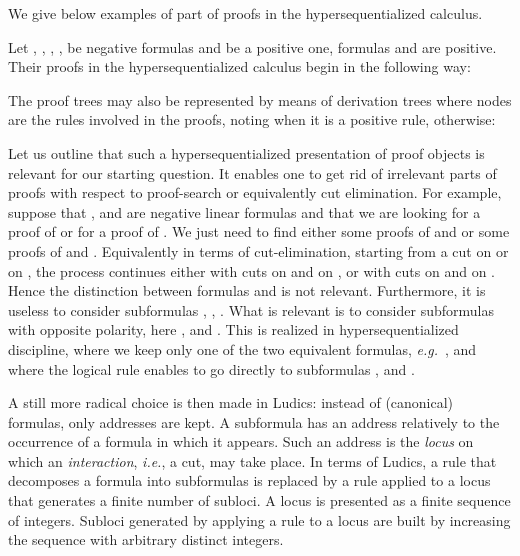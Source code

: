 \documentclass{LMCS}
\def\eg{{\em e.g.}}
\def\ie{{\em i.e.}}
\begin{document}
 We give below examples of part of proofs in the hypersequentialized calculus. 

\begin{exa}
Let , , , ,  be negative formulas and  be a positive one, formulas  and  are positive. Their proofs in the hypersequentialized calculus begin in the following way:

The proof trees may also be represented by means of derivation trees where nodes are the rules involved in the proofs, noting  when it is a positive rule,   otherwise:
\begin{center}
\hspace{.1cm}
\end{center}
\label{exa:proofs}
\end{exa}


\noindent Let us outline that such a hypersequentialized presentation of proof objects is relevant for  our starting question. It enables one to get rid of irrelevant  parts of proofs with respect to proof-search or equivalently  cut elimination. For example, suppose that ,  and  are negative linear formulas and that we are looking for a proof of  or for a proof of . We just need to find either some proofs of  and  or some proofs of  and . Equivalently in terms of cut-elimination, starting from a cut on   or on  , the process continues either with cuts on  and on , or with cuts on  and on . Hence the distinction between formulas  and   is not relevant. Furthermore, it is useless to consider subformulas  , , . What is relevant is to consider subformulas with opposite polarity, here ,  and . This is realized in hypersequentialized discipline, where we keep only one of the two equivalent formulas, \eg\ , and where the logical rule enables to go directly to subformulas ,  and .

A still more radical choice is then made in Ludics: instead of (canonical) formulas, only addresses are kept. A subformula has an address relatively to the occurrence of a formula in which it appears. Such an address is the {\em locus} on which an {\em interaction}, \ie, a cut, may take place. In terms of Ludics, a rule that decomposes a formula into subformulas is replaced by a rule applied to a locus that generates a finite number of subloci. 
A locus is presented as a finite sequence of integers. Subloci generated by applying a rule to a locus  are built by increasing the sequence  with arbitrary distinct integers. 
\end{document}
